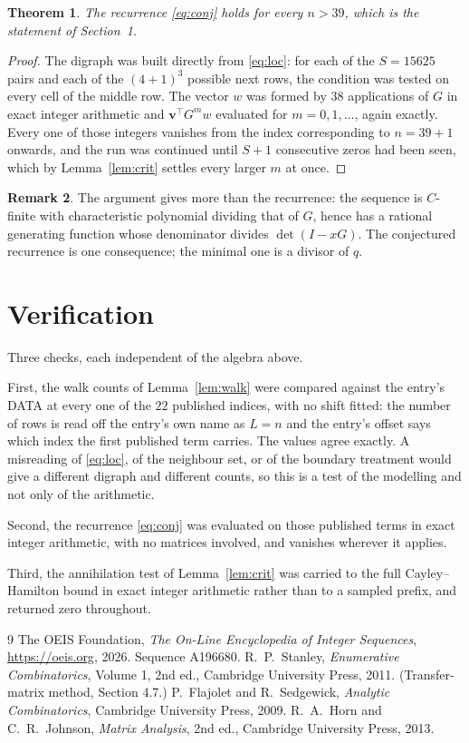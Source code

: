 \documentclass[11pt,a4paper]{article}
\theoremstyle{plain}
\newtheorem{theorem}{Theorem}
\theoremstyle{definition}
\newtheorem{remark}[theorem]{Remark}
\begin{document}
\begin{theorem}
The recurrence \eqref{eq:conj} holds for every $n>39$, which is the statement of
Section~1.
\end{theorem}

\begin{proof}
The digraph was built directly from \eqref{eq:loc}: for each of the $S=15625$ pairs and each
of the $(4+1)^{3}$ possible next rows, the condition was tested on every cell of
the middle row. The vector $w$ was formed by $38$ applications of $G$ in exact integer
arithmetic and $\mathbf{v}^{\!\top}G^{m}w$ evaluated for $m=0,1,\dots$, again exactly.
Every one of those integers vanishes from the index corresponding to $n=39+1$ onwards,
and the run was continued until $S+1$ consecutive zeros had been seen, which by
Lemma~\ref{lem:crit} settles every larger $m$ at once.
\end{proof}

\begin{remark}
The argument gives more than the recurrence: the sequence is $C$-finite with characteristic
polynomial dividing that of $G$, hence has a rational generating function whose denominator
divides $\det(I-xG)$. The conjectured recurrence is one consequence; the minimal one is a
divisor of $q$.
\end{remark}

\section{Verification}

Three checks, each independent of the algebra above.

First, the walk counts of Lemma~\ref{lem:walk} were compared against the entry's DATA at
every one of the $22$ published indices, with no shift fitted: the number of rows is
read off the entry's own name as $L=n$ and the entry's offset says which index the first
published term carries. The values agree exactly. A misreading of \eqref{eq:loc}, of the
neighbour set, or of the boundary treatment would give a different digraph and different
counts, so this is a test of the modelling and not only of the arithmetic.

Second, the recurrence \eqref{eq:conj} was evaluated on those published terms in exact
integer arithmetic, with no matrices involved, and vanishes wherever it applies.

Third, the annihilation test of Lemma~\ref{lem:crit} was carried to the full
Cayley--Hamilton bound in exact integer arithmetic rather than to a sampled prefix, and
returned zero throughout.

\begin{thebibliography}{9}
 The OEIS Foundation, \emph{The On-Line Encyclopedia of Integer
Sequences}, \url{https://oeis.org}, 2026. Sequence A196680.
 R.~P.~Stanley, \emph{Enumerative Combinatorics}, Volume 1, 2nd ed.,
Cambridge University Press, 2011. (Transfer-matrix method, Section 4.7.)
 P.~Flajolet and R.~Sedgewick, \emph{Analytic Combinatorics}, Cambridge
University Press, 2009.
 R.~A.~Horn and C.~R.~Johnson, \emph{Matrix Analysis}, 2nd ed., Cambridge
University Press, 2013.
\end{thebibliography}
\end{document}
